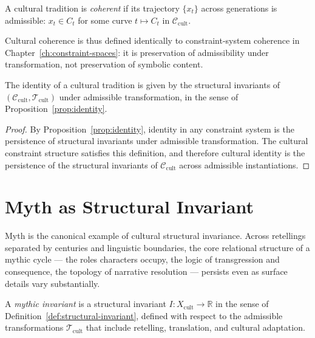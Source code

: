 \documentclass[11pt,openany]{book}
\begin{document}
\begin{definition}
\label{def:cultural-coherence}
A cultural tradition is \emph{coherent} if its trajectory
$\{x_t\}$ across generations is admissible: $x_t \in C_t$
for some curve $t \mapsto C_t$ in $\mathcal{C}_{\mathrm{cult}}$.
\end{definition}

Cultural coherence is thus defined identically to
constraint-system coherence in Chapter~\ref{ch:constraint-spaces}:
it is preservation of admissibility under transformation,
not preservation of symbolic content.

\begin{proposition}
\label{prop:cultural-identity}
The identity of a cultural tradition is given by the
structural invariants of $(\mathcal{C}_{\mathrm{cult}},
\mathcal{T}_{\mathrm{cult}})$ under admissible
transformation, in the sense of
Proposition~\ref{prop:identity}.
\end{proposition}

\begin{proof}
By Proposition~\ref{prop:identity}, identity in any
constraint system is the persistence of structural
invariants under admissible transformation.  The cultural
constraint structure satisfies this definition, and
therefore cultural identity is the persistence of the
structural invariants of $\mathcal{C}_{\mathrm{cult}}$
across admissible instantiations.
\end{proof}

\section{Myth as Structural Invariant}
\label{sec:myth-invariant}

Myth is the canonical example of cultural structural
invariance.  Across retellings separated by centuries and
linguistic boundaries, the core relational structure of a
mythic cycle — the roles characters occupy, the logic of
transgression and consequence, the topology of narrative
resolution — persists even as surface details vary
substantially.

\begin{definition}
\label{def:mythic-invariant}
A \emph{mythic invariant} is a structural invariant
$I : X_{\mathrm{cult}} \to \mathbb{R}$ in the sense of
Definition~\ref{def:structural-invariant}, defined with
respect to the admissible transformations
$\mathcal{T}_{\mathrm{cult}}$ that include retelling,
translation, and cultural adaptation.
\end{definition}
\end{document}

